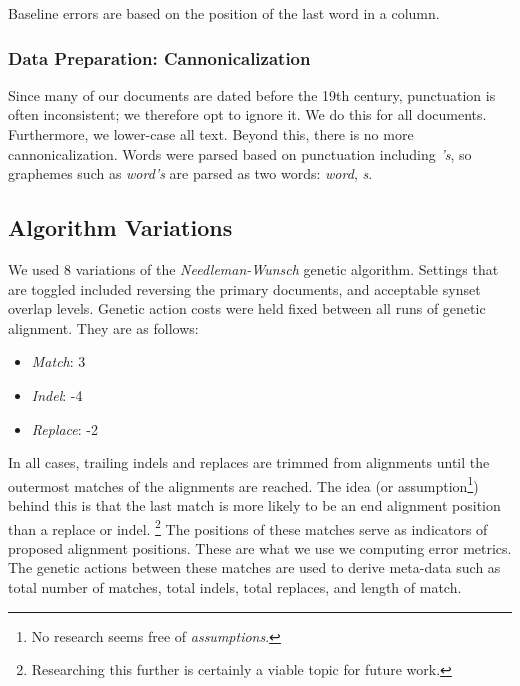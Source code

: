 Baseline errors are based on the position of the last word in a column.

\subsubsection{Data Preparation: Cannonicalization}
Since many of our documents are dated before the 19th century, punctuation is often inconsistent; we therefore opt to ignore it. We do this for all documents. Furthermore, we lower-case all text. Beyond this, there is no more cannonicalization. Words were parsed based on punctuation including \textit{'s}, so graphemes such as \textit{word's} are parsed as two words: \textit{word}, \textit{s}. %

\subsection{Algorithm Variations}
We used 8 variations of the \textit{Needleman-Wunsch} genetic algorithm. Settings that are toggled included reversing the primary documents, %
and acceptable synset overlap levels. Genetic action costs were held fixed between all runs of genetic alignment. They are as follows:

	\begin{itemize}
		\item \textit{Match}: 3
		\item \textit{Indel}: -4
		\item \textit{Replace}: -2
	\end{itemize}

In all cases, trailing indels and replaces are trimmed from alignments until the outermost matches of the alignments are reached. %
The idea (or assumption\footnote{No research seems free of \textit{assumptions}.}) behind this is that the last match is more likely to be an end alignment position than a replace or indel. \footnote{Researching this further is certainly a viable topic for future work.}
The positions of these matches serve as indicators of proposed alignment positions. These are what we use we computing error metrics. The genetic actions between these matches are used to derive meta-data such as total number of matches, total indels, total replaces, and length of match.

